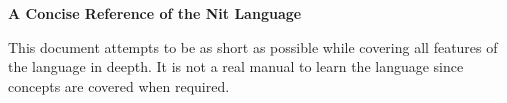 \documentclass[10pt]{article}
\title{\thedoctitle}
\author{Jean Privat}
\date{\today}
\newcommand\goto[1]{\hyperref[#1]{{\color{red}\scriptsize[\ref*{#1}]}}}
\begin{document}
\setlength\columnsep{8pt} %
\begin{multicols}{2}
\setlength\columnsep{4pt} %

\noindent\textbf{A Concise Reference of the Nit Language}

This document attempts to be as short as possible while covering all features of the language in deepth.
It is not a real manual to learn the language since concepts are covered when required.


\end{multicols}
\end{document}
